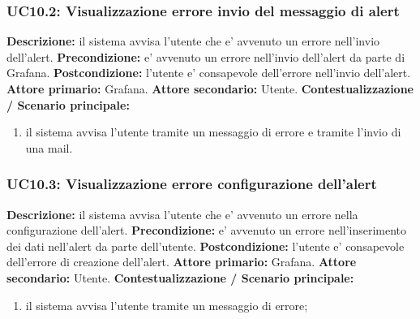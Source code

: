                 \subsubsection{UC10.2: Visualizzazione errore invio del messaggio di alert}
                    \textbf{Descrizione:} il sistema avvisa l’utente che e’ avvenuto un errore nell’invio dell’alert.
                    \newline
                    \textbf{Precondizione:} e’ avvenuto un errore nell’invio dell’alert da parte di Grafana.
                    \newline
                    \textbf{Postcondizione:} l’utente e’ consapevole dell’errore nell’invio dell’alert.
                    \newline
                    \textbf{Attore primario:} Grafana.
                    \newline
                    \textbf{Attore secondario:} Utente.
                    \newline
                    \textbf{Contestualizzazione / Scenario principale:} \begin{enumerate}
                            \item il sistema avvisa l’utente tramite un messaggio di errore e tramite l’invio di una mail.
                        \end{enumerate}
                        
                \subsubsection{UC10.3: Visualizzazione errore configurazione dell’alert}
                    \textbf{Descrizione:} il sistema avvisa l’utente che e’ avvenuto un errore nella configurazione dell’alert.
                    \newline
                    \textbf{Precondizione:}  e’ avvenuto un errore nell’inserimento dei dati nell’alert da parte dell’utente.
                    \newline
                    \textbf{Postcondizione:} l’utente e’ consapevole dell’errore di creazione dell’alert.
                    \newline
                    \textbf{Attore primario:} Grafana.
                    \newline
                    \textbf{Attore secondario:} Utente.
                    \newline
                    \textbf{Contestualizzazione / Scenario principale:} \begin{enumerate}
                            \item il sistema avvisa l’utente tramite un messaggio di errore;
                        \end{enumerate}
\newpage
